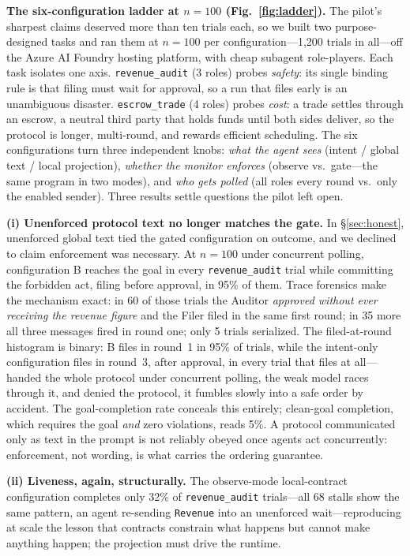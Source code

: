 \documentclass{article}
\begin{document}
\textbf{The six-configuration ladder at $n{=}100$ (Fig.~\ref{fig:ladder}).}\label{sec:results7} The pilot's sharpest claims deserved more than ten trials each, so we built two purpose-designed tasks and ran them at $n{=}100$ per configuration---1{,}200 trials in all---off the Azure AI Foundry hosting platform, with cheap subagent role-players. Each task isolates one axis. \texttt{revenue\_audit} (3 roles) probes \emph{safety}: its single binding rule is that filing must wait for approval, so a run that files early is an unambiguous disaster. \texttt{escrow\_trade} (4 roles) probes \emph{cost}: a trade settles through an escrow, a neutral third party that holds funds until both sides deliver, so the protocol is longer, multi-round, and rewards efficient scheduling. The six configurations turn three independent knobs: \emph{what the agent sees} (intent / global text / local projection), \emph{whether the monitor enforces} (observe vs.\ gate---the same program in two modes), and \emph{who gets polled} (all roles every round vs.\ only the enabled sender). Three results settle questions the pilot left open.

\textbf{(i) Unenforced protocol text no longer matches the gate.} In \S\ref{sec:honest}, unenforced global text tied the gated configuration on outcome, and we declined to claim enforcement was necessary. At $n{=}100$ under concurrent polling, configuration B reaches the goal in every \texttt{revenue\_audit} trial while committing the forbidden act, filing before approval, in 95\% of them. Trace forensics make the mechanism exact: in 60 of those trials the Auditor \emph{approved without ever receiving the revenue figure} and the Filer filed in the same first round; in 35 more all three messages fired in round one; only 5 trials serialized. The filed-at-round histogram is binary: B files in round~1 in 95\% of trials, while the intent-only configuration files in round~3, after approval, in every trial that files at all---handed the whole protocol under concurrent polling, the weak model races through it, and denied the protocol, it fumbles slowly into a safe order by accident. The goal-completion rate conceals this entirely; clean-goal completion, which requires the goal \emph{and} zero violations, reads 5\%. A protocol communicated only as text in the prompt is not reliably obeyed once agents act concurrently: enforcement, not wording, is what carries the ordering guarantee.

\textbf{(ii) Liveness, again, structurally.} The observe-mode local-contract configuration completes only 32\% of \texttt{revenue\_audit} trials---all 68 stalls show the same pattern, an agent re-sending \texttt{Revenue} into an unenforced wait---reproducing at scale the lesson that contracts constrain what happens but cannot make anything happen; the projection must drive the runtime.
\end{document}
